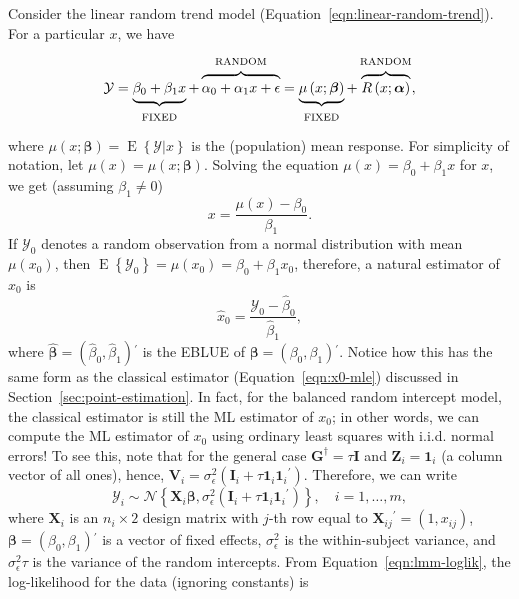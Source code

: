 \documentclass[cmfont,usenames,dvipsnames,leqno]{afit-etd}\usepackage[]{graphicx}\usepackage[]{color}
\newcommand{\trans}{\ensuremath{^\prime}}
\newcommand{\bc}[1]{\ensuremath{\bm{\mathcal{#1}}}}
\newcommand{\mc}[1]{\ensuremath{\mathcal{#1}}}
\newcommand{\wh}[1]{\ensuremath{\widehat{#1}}}
\newcommand{\E}{\operatorname{E}}
\newcommand{\X}{\ensuremath{\bm{X}}}
\newcommand{\Z}{\ensuremath{\bm{Z}}}
\begin{document}
Consider the linear random trend model (Equation~\eqref{eqn:linear-random-trend}). For a particular $x$, we have
\begin{equation*}
  \mc{Y} = \underbrace{\strut \beta_0 + \beta_1 x}_\text{\strut FIXED} + \overbrace{\strut \alpha_0 + \alpha_1 x + \epsilon}^\text{\strut RANDOM} = \underbrace{\strut \mu\left(x; \bm{\beta}\right)}_\text{\strut FIXED} + \overbrace{\strut R\left(x; \bm{\alpha}\right)}^\text{\strut RANDOM},
\end{equation*}
where $\mu\left(x; \bm{\beta}\right) = \E\left\{\mc{Y}|x\right\}$ is the (population) mean response. For simplicity of notation, let $\mu\left(x\right) = \mu\left(x; \bm{\beta}\right)$. Solving the equation $\mu(x) = \beta_0 + \beta_1 x$ for $x$, we get (assuming $
\beta_1 \ne 0$)
\begin{equation*}
  x = \frac{\mu(x) - \beta_0}{\beta_1}.
\end{equation*}
If $\mc{Y}_0$ denotes a random observation from a normal distribution with mean $\mu(x_0)$, then $\E\left\{\mc{Y}_0\right\} = \mu(x_0) = \beta_0 + \beta_1 x_0$, therefore, a natural estimator of $x_0$ is
\begin{equation}
\label{eqn:calibration-lmm-mle}
  \wh{x}_0 = \frac{\mc{Y}_0 - \wh{\beta}_0}{\wh{\beta}_1},
\end{equation}
where $\wh{\bm{\beta}} = \left(\wh{\beta}_0, \wh{\beta}_1\right)\trans$ is the \ac{EBLUE} of $\bm{\beta} = \left(\beta_0, \beta_1\right)\trans$. Notice how this has the same form as the classical estimator (Equation~\eqref{eqn:x0-mle}) discussed in Section~\ref{sec:point-estimation}. In fact, for the balanced random intercept model, the classical estimator is still the \ac{ML} estimator of $x_0$; in other words, we can compute the \ac{ML} estimator of $x_0$ using ordinary least squares with i.i.d. normal errors! To see this, note that for the general case $\bm{G}^\dagger = \tau\bm{I}$ and $\Z_i = \bm{1}_i$ (a column vector of all ones), hence, $\bm{V}_i = \sigma_\epsilon^2\left(\bm{I}_i + \tau\bm{1}_i\bm{1}_i\trans\right)$. Therefore, we can write
\begin{equation*}
  \bc{Y}_i \sim \mc{N}\left\{\X_i\bm{\beta}, \sigma_\epsilon^2\left(\bm{I}_i + \tau\bm{1}_i\bm{1}_i\trans\right)\right\}, \quad i = 1, \dotsc, m,
\end{equation*}
where $\X_i$ is an $n_i \times 2$ design matrix with $j$-th row equal to $\X_{ij}\trans = \left(1, x_{ij}\right)$, $\bm{\beta} = \left(\beta_0, \beta_1\right)\trans$ is a vector of fixed effects, $\sigma_\epsilon^2$ is the within-subject variance, and $\sigma_\epsilon^2\tau$ is the variance of the random intercepts. From Equation~\ref{eqn:lmm-loglik}, the log-likelihood for the data (ignoring constants) is
\end{document}
